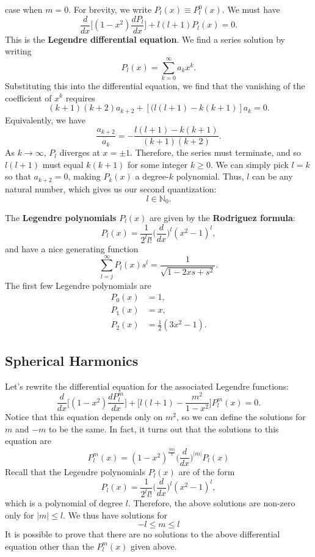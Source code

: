 case when $m=0$. For brevity, we write $P_l(x)\equiv P_l^0(x)$. We must have $$\frac{d}{dx}\bigg[(1-x^2)\frac{dP_l}{dx}\bigg]+l(l+1)P_l(x)=0.$$This is the \textbf{Legendre differential equation}. We find a series solution by writing $$P_l(x)=\sum_{k=0}^\infty a_kx^k.$$Substituting this into the differential equation, we find that the vanishing of the coefficient of $x^k$ requires $$(k+1)(k+2)a_{k+2}+[(l(l+1)-k(k+1)]a_k=0.$$Equivalently, we have $$\frac{a_{k+2}}{a_k}=-\frac{l(l+1)-k(k+1)}{(k+1)(k+2)}.$$As $k\to\infty$, $P_l$ diverges at $x=\pm1$. Therefore, the series must terminate, and so $l(l+1)$ must equal $k(k+1)$ for some integer $k\geq 0$. We can simply pick $l=k$ so that $a_{k+2}=0$, making $P_k(x)$ a degree-$k$ polynomial. Thus, $l$ can be any natural number, which gives us our second quantization: $$\boxed{l\in\mathbb{N}_0.}$$

\begin{frameddefn}\label{legendre_poly}
    The \textbf{Legendre polynomials} $P_l(x)$ are given by the \textbf{Rodriguez formula}: $$P_l(x)=\frac{1}{2^ll!}\big(\frac{d}{dx}\big)^l(x^2-1)^l,$$and have a nice generating function $$\sum_{l=j}^\infty P_l(x)s^l=\frac{1}{\sqrt{1-2xs+s^2}}.$$The first few Legendre polynomials are \begin{align*}P_0(x)&=1,\\ P_1(x) &=x,\\ P_2(x) &= \frac{1}{2}(3x^2-1).\end{align*}
\end{frameddefn}

\subsection{Spherical Harmonics}\label{spherical_harmonics}

Let's rewrite the differential equation for the associated Legendre functions: $$\frac{d}{dx}\bigg[(1-x^2)\frac{dP_l^m}{dx}\bigg]+\bigg[l(l+1)-\frac{m^2}{1-x^2}\bigg]P_l^m(x)=0.$$Notice that this equation depends only on $m^2$, so we can define the solutions for $m$ and $-m$ to be the same. In fact, it turns out that the solutions to this equation are $$P_l^m(x)=(1-x^2)^{\frac{|m|}{x}}\bigg(\frac{d}{dx}\bigg)^{|m|}P_l(x)$$Recall that the Legendre polynomials $P_l(x)$ are of the form $$P_l(x)=\frac{1}{2^ll!}\big(\frac{d}{dx}\big)^l(x^2-1)^l,$$which is a polynomial of degree $l$. Therefore, the above solutions are non-zero only for $|m|\leq l$. We thus have solutions for $$\boxed{-l\leq m\leq l}$$It is possible to prove that there are no solutions to the above differential equation other than the $P_l^m(x)$ given above. 

